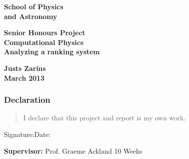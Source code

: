 \documentclass[a4paper,12pt]{article}
\begin{document}
\pagestyle{empty}                       %
\epsfxsize=40mm                         %
\begin{minipage}[b]{110mm}
        {\Huge\bf School of Physics\\ and Astronomy
        \vspace*{17mm}}
\end{minipage}
\hfill
\begin{minipage}[t]{40mm}               
\end{minipage}
\par\noindent                                           %
\vspace*{2cm}
\begin{center}
        \Large\bf \Large\bf Senior Honours Project\\
        \Large\bf Computational Physics\\[10pt]                     %
        \LARGE\bf Analyzing a ranking system         %
\end{center}
\vspace*{0.5cm}
\begin{center}
        \bf Justs Zarins\\                           %
        March 2013                                    %
\end{center}
\vspace*{5mm}
%
%                       
\begin{abstract}
        
\end{abstract}

\vspace*{1cm}

\subsubsection*{Declaration}

\begin{quotation}
        I declare that this project and report is my own work.
\end{quotation}

\vspace*{2cm}
Signature:\hspace*{8cm}Date:

\vfill
{\bf Supervisor:} Prof. Graeme Ackland                %
\hfill
10 Weeks                                         %
\newpage
%
\pagestyle{plain}                               %
\setcounter{page}{1}                            %
\tableofcontents                                %
\newpage
\end{document}
